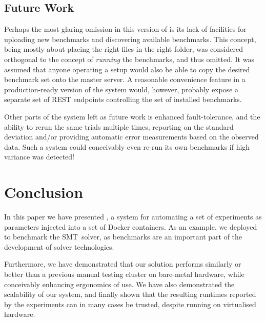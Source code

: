 \documentclass[a4paper]{IEEEtran}
\begin{document}
\subsection{Future Work}

Perhaps the most glaring omission in this version of \testbench{} is its lack of
facilities for uploading new benchmarks and discovering available benchmarks.
This concept, being mostly about placing the right files in the right folder,
was considered orthogonal to the concept of \emph{running} the benchmarks, and
thus omitted. It was assumed that anyone operating a \testbench{} setup would
also be able to copy the desired benchmark set onto the master server. A
reasonable convenience feature in a production-ready version of the system
would, however, probably expose a separate set of REST endpoints controlling the
set of installed benchmarks.

Other parts of the system left as future work is enhanced fault-tolerance, and
the ability to rerun the same trials multiple times, reporting on the standard
deviation and/or providing automatic error measurements based on the observed
data. Such a system could conceivably even re-run its own benchmarks if high
variance was detected!

\section{Conclusion}

In this paper we have presented \testbench{}, a system for automating a set of
experiments as parameters injected into a set of Docker containers. As an
example, we deployed \testbench{} to benchmark the \uppsat{} SMT~solver, as
benchmarks are an important part of the development of solver technologies.

Furthermore, we have demonstrated that our solution performs similarly or better
than a previous manual testing cluster on bare-metal hardware, while conceivably
enhancing ergonomics of use. We have also demonstrated the scalability of our
system, and finally shown that the resulting runtimes reported by the
experiments can in many cases be trusted, despite running on virtualised
hardware.

\printbibliography
\end{document}
